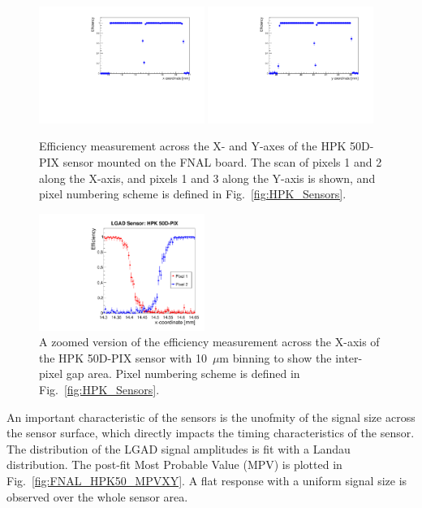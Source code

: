 \documentclass[preprint,1p]{elsarticle}
\begin{document}
\begin{figure}[htbp] 
\centering
\includegraphics[width=0.48\textwidth]{figs/FNALBoard_HPK50DPix_Run847-891/Eff_vs_X_Ch4_5.pdf} 
\includegraphics[width=0.48\textwidth]{figs/FNALBoard_HPK50DPix_Run847-891/Eff_vs_Y_Ch3_4.pdf} 
\caption{Efficiency measurement across the X- and Y-axes of the HPK 50D-PIX sensor mounted on the FNAL board. The scan of pixels 1 and 2 along the X-axis, and pixels 1 and 3 along the Y-axis is shown, and pixel numbering scheme is defined in Fig.~\ref{fig:HPK_Sensors}.} 
\label{fig:FNAL_HPK50_effXY} 
\end{figure} 

\begin{figure}[htbp] 
\centering
\includegraphics[width=0.48\textwidth]{figs/KUBoard_HPK50DPix_Run638-781/EfficiencyInGap_HPK50DPix.pdf} 
\caption{A zoomed version of the efficiency measurement across the X-axis of the HPK 50D-PIX sensor with 10~$\mu$m binning to show the inter-pixel gap area. Pixel numbering scheme is defined in Fig.~\ref{fig:HPK_Sensors}.} 
\label{fig:FNAL_HPK50_ZoomeffXY} 
\end{figure} 

An important characteristic of the sensors is the unofmity of the signal size
across the sensor surface, which directly impacts the timing characteristics of
the sensor. The distribution of the LGAD signal amplitudes is fit with a Landau
distribution. The post-fit Most Probable Value (MPV) is
plotted in Fig.~\ref{fig:FNAL_HPK50_MPVXY}. A flat response with a uniform
signal size is observed over the whole sensor area.
\end{document}
